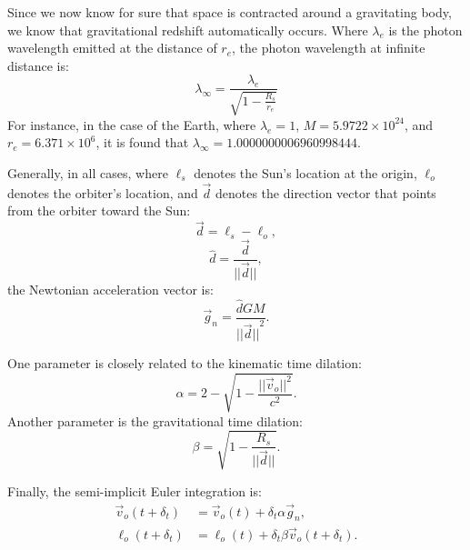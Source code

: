 \documentclass[12pt]{article}
\begin{document}
Since we now know for sure that space is contracted around a gravitating body, we know that gravitational redshift automatically occurs.
Where $\lambda_{e}$ is the photon wavelength emitted at the distance of $r_e$, the photon wavelength at infinite distance is:
\begin{equation}
\label{wl_inf}
\lambda_{\infty} = \frac{\lambda_{e}}{\sqrt{1 - \frac{R_s}{r_e}}}
\end{equation}
For instance, in the case of the Earth, where $\lambda_{e} = 1$, $M = 5.9722 \times 10^{24}$, and $r_e = 6.371 \times 10^6$, it is found that $\lambda_{\infty} = 1.0000000006960998444$.





Generally, in all cases, where $\ell_s$ denotes the Sun's location at the origin, $\ell_o$ denotes the orbiter's location, and $\vec{d}$ denotes the direction vector that points from the orbiter toward the Sun:
\begin{equation}
\label{direction_vector}
\vec{d} = \ell_{s} - \ell_{o},	
\end{equation}
\begin{equation}
\label{direction_unit_vector}
\hat{d} = \frac{\vec{d}}{\lvert\lvert \vec{d} \rvert\rvert},
\end{equation}
the Newtonian acceleration vector is:
\begin{equation}
\label{newton}
\vec{g}_n = \frac{\hat{d} G M}{{\lvert\lvert \vec{d} \rvert\rvert}^2}.
\end{equation}

One parameter is closely related to the kinematic time dilation:
\begin{equation}
\label{eq_kinematic}
\alpha = 2 - \sqrt{1 - \frac{\lvert\lvert \vec{v}_{o}\rvert\rvert^2}{c^2}}.
\end{equation}
Another parameter is the gravitational time dilation:
\begin{equation}
\label{eq_gravitational}
\beta = \sqrt{1 - \frac{R_{s}}{\lvert \lvert \vec{d} \rvert \rvert}}.
\end{equation}

Finally, the semi-implicit Euler integration is:
\begin{align}
\label{eq_velocity}
\vec{v}_{o}(t + \delta_t) &= \vec{v}_{o}(t) + \delta_{t} \alpha \vec{g}_n, \\
\label{eq_position}
\ell_{o}(t + \delta_t) &= \ell_{o}(t) + \delta_{t} \beta \vec{v}_{o}(t + \delta_t).
\end{align}
\end{document}
